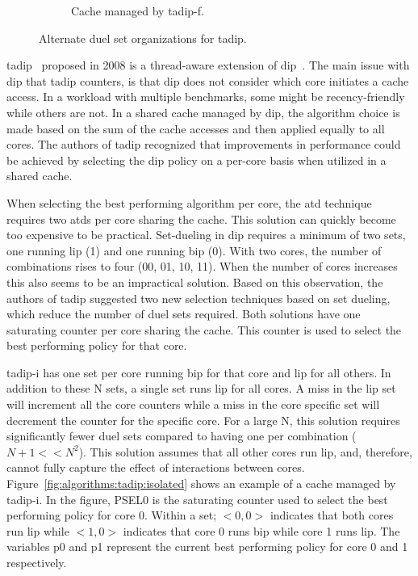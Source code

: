 \begin{figure}[t]
\begin{subfigure}[b]{0.45\textwidth}
        \caption{Cache managed by \gls{tadip-f}.}
        \label{fig:algorithms:tadip:feedback}
    \end{subfigure}    
    \caption{Alternate duel set organizations for \gls{tadip}.}
    \label{fig:algorithms:tadip}
\end{figure}

\gls{tadip}~\cite{Jaleel2008} proposed in 2008 is a thread-aware extension of \gls{dip}~\cite{Qureshi2007}.
The main issue with \gls{dip} that \gls{tadip} counters, is that \gls{dip} does not consider which core initiates a cache access.
In a workload with multiple benchmarks, some might be recency-friendly while others are not. 
In a shared cache managed by \gls{dip}, the algorithm choice is made based on the sum of the cache accesses and then applied equally to all cores.
The authors of \gls{tadip} recognized that improvements in performance could be achieved by selecting the \gls{dip} policy on a per-core basis when utilized in a shared cache.

When selecting the best performing algorithm per core, the \gls{atd} technique requires two \glspl{atd} per core sharing the cache. 
This solution can quickly become too expensive to be practical.
Set-dueling in \gls{dip} requires a minimum of two sets, one running \gls{lip} (1) and one running \gls{bip} (0). 
With two cores, the number of combinations rises to four (00, 01, 10, 11).
When the number of cores increases this also seems to be an impractical solution.
Based on this observation, the authors of \gls{tadip} suggested two new selection techniques based on set dueling, which reduce the number of duel sets required.
Both solutions have one saturating counter per core sharing the cache.
This counter is used to select the best performing policy for that core.

\gls{tadip-i} has one set per core running \gls{bip} for that core and \gls{lip} for all others.
In addition to these N sets, a single set runs \gls{lip} for all cores. 
A miss in the \gls{lip} set will increment all the core counters while a miss in the core specific set will decrement the counter for the specific core.
For a large N, this solution requires significantly fewer duel sets compared to having one per combination ($N+1 << N^2$). 
This solution assumes that all other cores run \gls{lip}, and, therefore, cannot fully capture the effect of interactions between cores.
Figure~\ref{fig:algorithms:tadip:isolated} shows an example of a cache managed by \gls{tadip-i}. 
In the figure, PSEL0 is the saturating counter used to select the best performing policy for core 0.
Within a set; $<0, 0>$ indicates that both cores run \gls{lip} while $<1, 0>$ indicates that core 0 runs \gls{bip} while core 1 runs \gls{lip}.
The variables p0 and p1 represent the current best performing policy for core 0 and 1 respectively.

